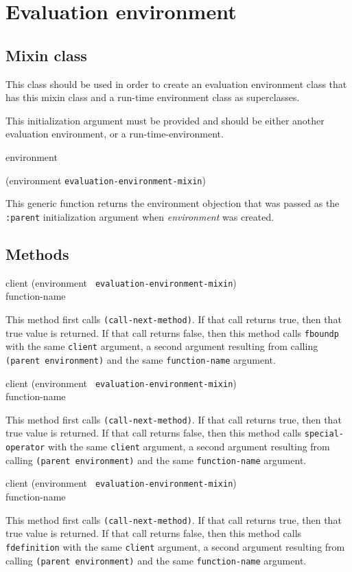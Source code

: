 \chapter{Evaluation environment}

\section{Mixin class}


This class should be used in order to create an evaluation environment
class that has this mixin class and a run-time environment class as
superclasses.


This initialization argument must be provided and should be either
another evaluation environment, or a run-time-environment.

 {environment}

 {(environment {\tt evaluation-environment-mixin})}

This generic function returns the environment objection that was passed
as the \texttt{:parent} initialization argument when
\textit{environment} was created.

\section{Methods}

{\small{} {client (environment {\tt
      evaluation-environment-mixin}) \\ function-name}
}

This method first calls \texttt{(call-next-method)}.  If that call
returns true, then that true value is returned.  If that call returns
false, then this method calls \texttt{fboundp} with the same
\texttt{client} argument, a second argument resulting from calling
\texttt{(parent environment)} and the same \texttt{function-name}
argument.

{\small{} {client (environment {\tt
      evaluation-environment-mixin}) \\ function-name}
}

This method first calls \texttt{(call-next-method)}.  If that call
returns true, then that true value is returned.  If that call returns
false, then this method calls \texttt{special-operator} with the same
\texttt{client} argument, a second argument resulting from calling
\texttt{(parent environment)} and the same \texttt{function-name}
argument.

{\small{} {client (environment {\tt
      evaluation-environment-mixin}) \\ function-name}
}

This method first calls \texttt{(call-next-method)}.  If that call
returns true, then that true value is returned.  If that call returns
false, then this method calls \texttt{fdefinition} with the same
\texttt{client} argument, a second argument resulting from calling
\texttt{(parent environment)} and the same \texttt{function-name}
argument.
